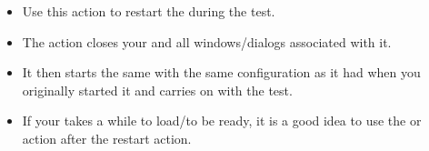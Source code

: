 
\begin{itemize}
\item Use this action to restart the \gdaut{} during the test. 
\item The action closes your \gdaut{} and all windows/dialogs associated with it. 
\item It then starts the same \gdaut{} with the same configuration as it had when you originally started it and carries on with the test. 
\item If your \gdaut{} takes a while to load/to be ready, it is a good idea to use the  or  action after the restart action. 
\end{itemize}

